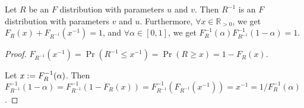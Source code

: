 \documentclass[a4paper, 12pt, fleqn]{article}
\begin{document}
\begin{lemma}
Let $R$ be an $F$ distribution with parameters $u$ and $v$.
Then $R^{-1}$ is an $F$ distribution with parameters $v$ and $u$.
Furthermore, $\forall x \in \mathbb{R}_{> 0}$, we get $F_R(x) + F_{R^{-1}}(x^{-1}) = 1$,
and $\forall \alpha \in [0, 1]$, we get $F_R^{-1}(\alpha)F_{R^{-1}}^{-1}(1-\alpha) = 1$.
\end{lemma}
\begin{proof}
$F_{R^{-1}}(x^{-1}) = \Pr(R^{-1} \le x^{-1}) = \Pr(R \ge x) = 1 - F_R(x)$.

Let $x := F_R^{-1}(\alpha)$. Then
\\ $F_{R^{-1}}^{-1}(1-\alpha) = F_{R^{-1}}^{-1}(1 - F_R(x))
= F_{R^{-1}}^{-1}(F_{R^{-1}}(x^{-1})) = x^{-1} = 1/F_R^{-1}(\alpha)$.
\end{proof}



\end{document}
